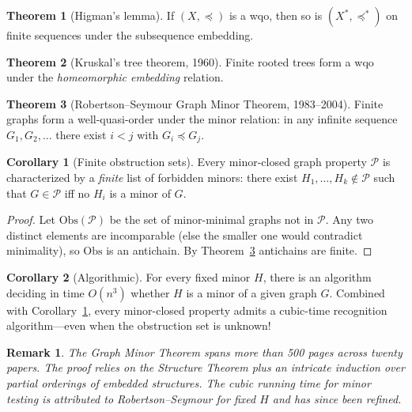 \documentclass{article}
\newtheorem{remark}{Remark}
\theoremstyle{definition}
\newtheorem{theorem}{Theorem}
\newtheorem{corollary}{Corollary}
\begin{document}
\begin{theorem}[Higman's lemma]
If $(X, \preceq)$ is a wqo, then so is $(X^*, \preceq^*)$ on finite
sequences under the subsequence embedding.
\end{theorem}

\begin{theorem}[Kruskal's tree theorem, 1960]
Finite rooted trees form a wqo under the \emph{homeomorphic
embedding} relation.
\end{theorem}

\begin{theorem}[Robertson--Seymour Graph Minor Theorem, 1983--2004]\label{thm:robertsonseymour}
Finite graphs form a well-quasi-order under the minor relation:
in any infinite sequence $G_1, G_2, \dots$ there exist $i < j$ with
$G_i \preceq G_j$.
\end{theorem}

\begin{corollary}[Finite obstruction sets]\label{cor:finiteobstruction}
Every minor-closed graph property $\mathcal{P}$ is characterized by a
\emph{finite} list of forbidden minors: there exist
$H_1, \dots, H_k \notin \mathcal P$ such that $G \in \mathcal P$ iff
no $H_i$ is a minor of $G$.
\end{corollary}

\begin{proof}
Let $\mathrm{Obs}(\mathcal P)$ be the set of minor-minimal graphs not
in $\mathcal P$. Any two distinct elements are incomparable (else the
smaller one would contradict minimality), so $\mathrm{Obs}$ is an
antichain. By Theorem~\ref{thm:robertsonseymour} antichains are
finite.
\end{proof}

\begin{corollary}[Algorithmic]
For every fixed minor $H$, there is an algorithm deciding in time
$O(n^3)$ whether $H$ is a minor of a given graph $G$. Combined with
Corollary~\ref{cor:finiteobstruction}, every minor-closed property
admits a cubic-time recognition algorithm---even when the obstruction
set is unknown!
\end{corollary}

\begin{remark}
The Graph Minor Theorem spans more than 500 pages across twenty
papers. The proof relies on the Structure Theorem plus an intricate
induction over partial orderings of embedded structures. The cubic
running time for minor testing is attributed to Robertson--Seymour
for fixed $H$ and has since been refined.
\end{remark}
\end{document}
